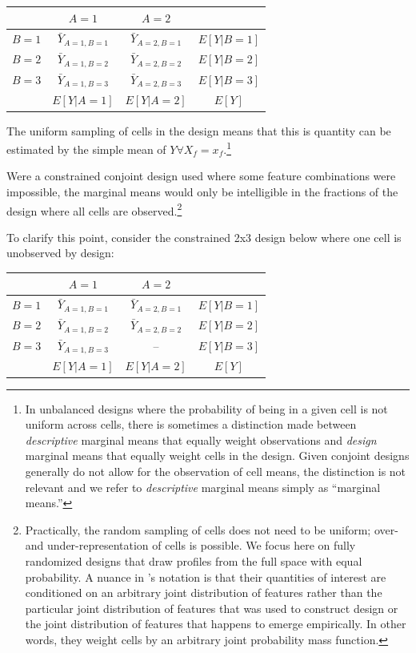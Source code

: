 \documentclass[a4paper,12pt]{article}\usepackage[]{graphicx}\usepackage[]{color}
\begin{document}
\begin{center}
\begin{tabular}{lccc}\toprule
 & $A = 1$ & $A = 2$ & \\ \midrule
$B = 1$ & $\bar{Y}_{A=1, B=1}$ & $\bar{Y}_{A=2, B=1}$ & $E[Y|B=1]$ \\
$B = 2$ & $\bar{Y}_{A=1, B=2}$ & $\bar{Y}_{A=2, B=2}$ & $E[Y|B=2]$ \\
$B = 3$ & $\bar{Y}_{A=1, B=3}$ & $\bar{Y}_{A=2, B=3}$ & $E[Y|B=3]$ \\ \midrule
 & $E[Y|A=1]$ & $E[Y|A=2]$ & $E[Y]$ \\ \bottomrule
\end{tabular}
\end{center}

The uniform sampling of cells in the design means that this is quantity can be estimated by the simple mean of $Y \forall X_f = x_f$.\footnote{In unbalanced designs where the probability of being in a given cell is not uniform across cells, there is sometimes a distinction made between \textit{descriptive} marginal means that equally weight observations and \textit{design} marginal means that equally weight cells in the design. Given conjoint designs generally do not allow for the observation of cell means, the distinction is not relevant and we refer to \textit{descriptive} marginal means simply as ``marginal means.''}

Were a constrained conjoint design used where some feature combinations were impossible, the marginal means would only be intelligible in the fractions of the design where all cells are observed.\footnote{Practically, the random sampling of cells does not need to be uniform; over- and under-representation of cells is possible. We focus here on fully randomized designs that draw profiles from the full space with equal probability. A nuance in \citeauthor{HainmuellerHopkinsYamamoto2014}'s notation is that their quantities of interest are conditioned on an arbitrary joint distribution of features rather than the particular joint distribution of features that was used to construct design or the joint distribution of features that happens to emerge empirically. In other words, they weight cells by an arbitrary joint probability mass function.}

To clarify this point, consider the constrained 2x3 design below where one cell is unobserved by design:

\begin{center}
\begin{tabular}{lccc}\toprule
 & $A = 1$ & $A = 2$ & \\ \midrule
$B = 1$ & $\bar{Y}_{A=1, B=1}$ & $\bar{Y}_{A=2, B=1}$ & $E[Y|B=1]$ \\
$B = 2$ & $\bar{Y}_{A=1, B=2}$ & $\bar{Y}_{A=2, B=2}$ & $E[Y|B=2]$ \\
$B = 3$ & $\bar{Y}_{A=1, B=3}$ & -- & $E[Y|B=3]$ \\ \midrule
 & $E[Y|A=1]$ & $E[Y|A=2]$ & $E[Y]$ \\ \bottomrule
\end{tabular}
\end{center}
\end{document}
